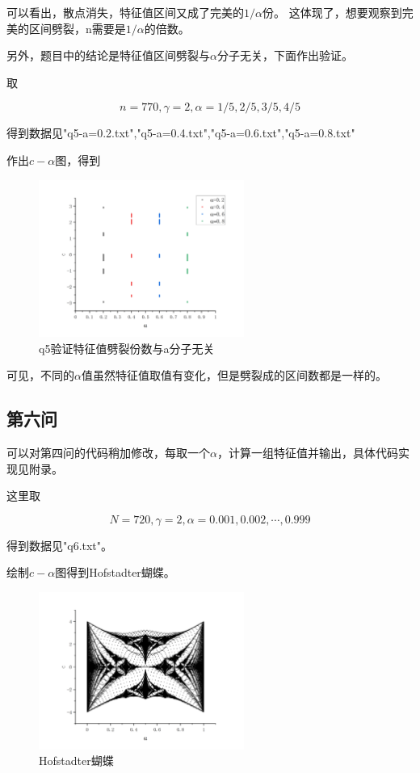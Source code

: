 \documentclass[10pt, a4paper]{article}
\begin{document}
    可以看出，散点消失，特征值区间又成了完美的$1/\alpha$份。
    这体现了，想要观察到完美的区间劈裂，n需要是$1/\alpha$的倍数。

    另外，题目中的结论是特征值区间劈裂与$\alpha$分子无关，下面作出验证。

    取

    \[n=770,\gamma=2,\alpha=1/5,2/5,3/5,4/5\]
    
    得到数据见"q5-a=0.2.txt","q5-a=0.4.txt","q5-a=0.6.txt","q5-a=0.8.txt"

    作出$c-\alpha$图，得到

    \begin{figure}[H]
        \centering
        \includegraphics[width=0.6\textwidth]{q5验证特征值劈裂份数与a分子无关.jpg}
        \caption{q5验证特征值劈裂份数与a分子无关}\label{fig:q5验证特征值劈裂份数与a分子无关}
    \end{figure}

    可见，不同的$\alpha$值虽然特征值取值有变化，但是劈裂成的区间数都是一样的。

    \subsection{第六问}

    可以对第四问的代码稍加修改，每取一个$\alpha$，计算一组特征值并输出，具体代码实现见附录。

    这里取

    \[N=720,\gamma=2,\alpha=0.001,0.002,\cdots,0.999\]

    得到数据见"q6.txt"。

    绘制$c-\alpha$图得到Hofstadter蝴蝶。

    \begin{figure}[H]
        \centering
        \includegraphics[width=0.6\textwidth]{Hofstadter蝴蝶.jpg}
        \caption{Hofstadter蝴蝶}\label{fig:Hofstadter蝴蝶}
    \end{figure}
\end{document}
